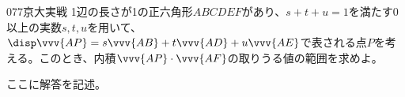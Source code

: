\begin{thm}{077}{}{京大実戦}
 1辺の長さが1の正六角形$ABCDEF$があり、$s+t+u=1$を満たす0以上の実数$s, t, u$を用いて、$\disp \vvv{AP}=s\vvv{AB}+t\vvv{AD}+u\vvv{AE}$で表される点$P$を考える。このとき、内積$\vvv{AP}\cdot\vvv{AF}$の取りうる値の範囲を求めよ。
\end{thm}

ここに解答を記述。
